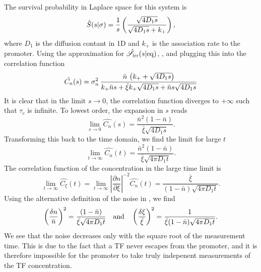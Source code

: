 The survival probability in Laplace space for this system is
\begin{equation}
 \hat{S}(s|\sigma) = \frac{1}{s}\left( \frac{\sqrt{4 D_1 s}}{\sqrt{4 D_1 s} + k_+} \right),
 \elabel{LSx0}
\end{equation}
where $D_1$ is the diffusion contant in 1D and $k_+$ is the association rate to the promoter. Using the approximation for $\hat{\mathscr{S}}_{\rm irr}(s|{\rm eq})$, , and plugging this into the correlation function 
\begin{equation}
  \hat{C_n}(s) = \sigma_n^2 \, \frac{\bar{n} \, \left( k_+ + \sqrt{4 D_1 s} \right)}{k_+ \bar{n} s + \bar{\xi} k_+ \sqrt{4 D_1 s} + \bar{n} s \sqrt{4 D_1 s}}
  \elabel{LapCorr1D}
\end{equation}
It is clear that in the limit $s \to 0$, the correlation function diverges to $+\infty$ such that $\tau_c$ is infinite. To lowest order, the expansion in $s$ reads
\begin{equation}
 \lim_{s \to 0} \hat{C_n}(s) = \frac{\bar{n}^2(1-\bar{n})}{\bar{\xi} \sqrt{4 D_1 s}}.
\end{equation}
Transforming this back to the time domain, we find the limit for large $t$
\begin{equation}
 \lim_{t \to \infty} \hat{C_n}(t) = \frac{\bar{n}^2(1-\bar{n})}{\bar{\xi} \sqrt{4 \pi D_1 t}}.
\end{equation}
The correlation function of the concentration in the large time limit is
\begin{equation}
 \lim_{t \to \infty} \hat{C_{\xi}}(t) = \lim_{t \to \infty} \left| \frac{\partial n}{\partial \xi} \right|^{-2} \hat{C_n}(t) = \frac{\bar{\xi}}{(1 - \bar{n}) \sqrt{4 \pi D_1 t}}.
\end{equation}
Using the alternative definition of the noise in , we find
\begin{equation}
 \left( \frac{\delta n}{\bar{n}} \right)^2 =  \frac{(1-\bar{n})}{\bar{\xi} \sqrt{4 \pi D_1 t}} \quad \text{and} \quad \left( \frac{\delta \xi}{\bar{\xi}} \right)^2 = \frac{1}{ \bar{\xi} (1 - \bar{n}) \sqrt{4 \pi D_1 t}}. 
 \elabel{Noise1D}
\end{equation}
We see that the noise decreases only with the square root of the measurement time. This is due to the fact that a TF never escapes from the promoter, and it is therefore impossible for the promoter to take truly indepenent measurements of the TF concentration. 


